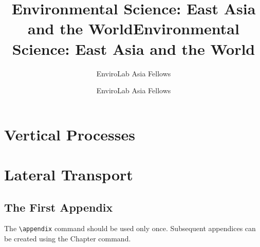 \documentclass{book}%
\title{Environmental Science: East Asia and the World}
\author{EnviroLab Asia Fellows}
\title{Environmental Science: East Asia and the World}
\author{EnviroLab Asia Fellows}
\begin{document}
\frontmatter

\maketitle
\tableofcontents






\mainmatter



\part{Vertical Processes}























\part{Lateral Transport}














\appendix

\chapter{The First Appendix}

The \verb"\appendix" command should be used only once. Subsequent appendices can
be created using the Chapter command.
\end{document}
